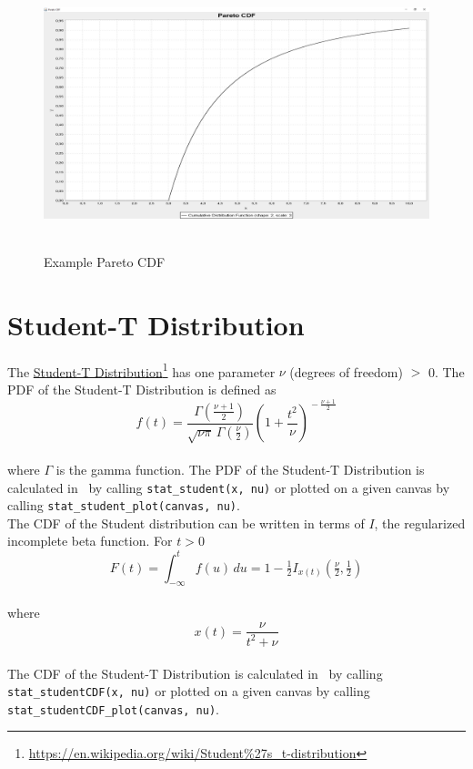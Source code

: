 		\begin{figure}[H]
			\centering
			\includegraphics[width=1\textwidth]{Figures/implemented_functions/pareto_cdf}~\\
			\caption{Example Pareto CDF}
			\label{fig:pareto_cdf}
		\end{figure}

		
	\section{Student-T Distribution}
	
		The \href{https://en.wikipedia.org/wiki/Student\%27s_t-distribution}{Student-T Distribution}\footnote{\url{https://en.wikipedia.org/wiki/Student\%27s_t-distribution}} has one parameter $\nu$ (degrees of freedom) $>$ 0. The \ac{PDF} of the Student-T Distribution is defined as
		\\[0.3cm]
		$$f(t) = \frac{\Gamma(\frac{\nu+1}{2})} {\sqrt{\nu\pi}\,\Gamma(\frac{\nu}{2})} \left(1+\frac{t^2}{\nu} \right)^{\!-\frac{\nu+1}{2}}$$
		\\[0.3cm]
		where $\Gamma$ is the gamma function. The \ac{PDF} of the Student-T Distribution is calculated in \setlx\ by calling \lstinline{stat_student(x, nu)} or plotted on a given canvas by calling \lstinline{stat_student_plot(canvas, nu)}.
		\\[0.3cm]
		The \ac{CDF} of the Student distribution can be written in terms of $I$, the regularized incomplete beta function. For $t > 0$
		\\[0.3cm]
		$$F(t) = \int_{-\infty}^t f(u)\,du = 1 - \tfrac{1}{2} I_{x(t)}\left(\tfrac{\nu}{2}, \tfrac{1}{2}\right)$$
		\\[0.3cm]
		where $$x(t) = \frac{\nu}{{t^2+\nu}}$$
		\\[0.3cm]
		The \ac{CDF} of the Student-T Distribution is calculated in \setlx\ by calling \lstinline{stat_studentCDF(x, nu)} or plotted on a given canvas by calling \lstinline{stat_studentCDF_plot(canvas, nu)}.

